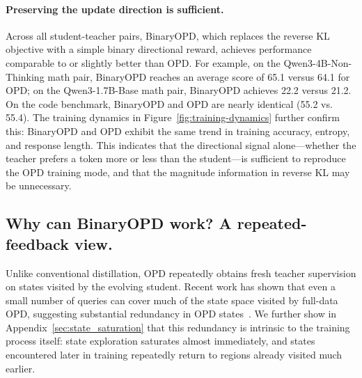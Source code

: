 \documentclass{article}
\theoremstyle{remark}
\begin{document}
\paragraph{Preserving the update direction is sufficient.}
Across all student-teacher pairs, BinaryOPD, which replaces the reverse KL objective with a simple binary directional reward, achieves performance comparable to or slightly better than OPD. For example, on the Qwen3-4B-Non-Thinking math pair, BinaryOPD reaches an average score of 65.1 versus 64.1 for OPD; on the Qwen3-1.7B-Base math pair, BinaryOPD achieves 22.2 versus 21.2. On the code benchmark, BinaryOPD and OPD are nearly identical (55.2 vs. 55.4). The training dynamics in Figure~\ref{fig:training-dynamics} further confirm this: BinaryOPD and OPD exhibit the same trend in training accuracy, entropy, and response length. This indicates that the directional signal alone---whether the teacher prefers a token more or less than the student---is sufficient to reproduce the OPD training mode, and that the magnitude information in reverse KL may be unnecessary. 


\subsection{Why can BinaryOPD work? A repeated-feedback view.}
Unlike conventional distillation, OPD repeatedly obtains fresh teacher
supervision on states visited by the evolving student. Recent work has shown
that even a small number of queries can cover much of the state space visited
by full-data OPD, suggesting substantial redundancy in OPD
states~\citep{fu2026rethinking}. We further show in
Appendix~\ref{sec:state_saturation} that this redundancy is intrinsic to the
training process itself: state exploration saturates almost immediately, and
states encountered later in training repeatedly return to regions already
visited much earlier.
\end{document}
